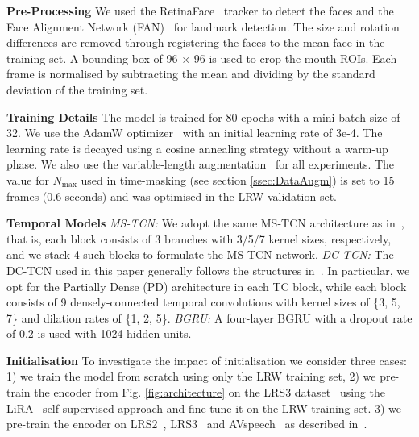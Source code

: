 \documentclass{article}
\begin{document}
\noindent\textbf{Pre-Processing}\quad
We used the RetinaFace~\cite{DBLP:journals/corr/abs-1905-00641} tracker to detect the faces and the Face Alignment Network (FAN)~\cite{bulat2017far} for landmark detection. The size and rotation differences are removed through registering the faces to the mean face in the training set. A bounding box of 96 $\times$ 96 is used to crop the mouth ROIs. Each frame is normalised by subtracting the mean and dividing by the standard deviation of the training set.

\noindent\textbf{Training Details}\quad
The model is trained for 80 epochs with a mini-batch size of 32. 
We use the AdamW optimizer~\cite{loshchilov2017decoupled} with an initial learning rate of 3e-4. The learning rate is decayed using a cosine annealing strategy without a warm-up phase. We also use the variable-length augmentation~\cite{martinez2020lipreading} for all experiments. The value for $N_{\text{max}}$ used in time-masking (see section \ref{ssec:DataAugm}) is set to 15 frames (0.6 seconds) and was optimised in the LRW validation set. 

\noindent\textbf{Temporal Models}\quad
\textit{MS-TCN:} We adopt the same MS-TCN architecture as in~\cite{martinez2020lipreading}, that is, each block consists of 3 branches with 3/5/7 kernel sizes, respectively, and we stack 4 such blocks to formulate the MS-TCN network.
\textit{DC-TCN:}
The DC-TCN used in this paper generally follows the structures in~\cite{ma2021lip}. In particular, we opt for the Partially Dense (PD) architecture in each TC block, while each block consists of 9 densely-connected temporal convolutions with kernel sizes of \{3, 5, 7\} and dilation rates of \{1, 2, 5\}.  
\textit{BGRU:} A four-layer BGRU with a dropout rate of 0.2 is used with 1024 hidden units.

\noindent\textbf{Initialisation}\quad
To investigate the impact of initialisation we consider three cases: 1) we train the model from scratch using only the LRW training set, 2) we pre-train the encoder from Fig. \ref{fig:architecture} on the LRS3 dataset~\cite{Afouras18d} using the LiRA~\cite{DBLP:journals/corr/abs-2106-09171} self-supervised approach and fine-tune it on the LRW training set. 3) we pre-train the encoder on LRS2~\cite{chung16b}, LRS3~\cite{Afouras18d} and AVspeech~\cite{DBLP:journals/tog/EphratMLDWHFR18} as described in~\cite{ma2022visual}.
\end{document}
